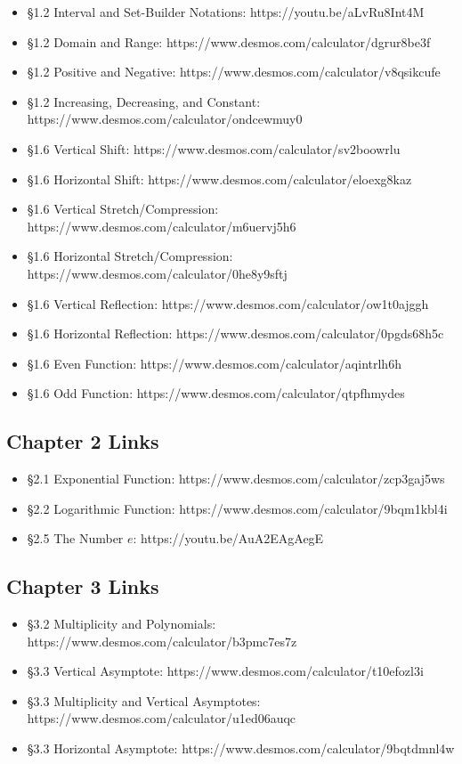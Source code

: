 \begin{itemize}
	\item \S1.2 Interval and Set-Builder Notations: https://youtu.be/aLvRu8Int4M
	\item \S1.2 Domain and Range: https://www.desmos.com/calculator/dgrur8be3f
	\item \S1.2 Positive and Negative: https://www.desmos.com/calculator/v8qsikcufe
	\item \S1.2 Increasing, Decreasing, and Constant: https://www.desmos.com/calculator/ondcewmuy0
	\item \S1.6 Vertical Shift: https://www.desmos.com/calculator/sv2boowrlu
	\item \S1.6 Horizontal Shift: https://www.desmos.com/calculator/eloexg8kaz
	\item \S1.6 Vertical Stretch/Compression: https://www.desmos.com/calculator/m6uervj5h6
	\item \S1.6 Horizontal Stretch/Compression: https://www.desmos.com/calculator/0he8y9sftj
	\item \S1.6 Vertical Reflection: https://www.desmos.com/calculator/ow1t0ajggh
	\item \S1.6 Horizontal Reflection: https://www.desmos.com/calculator/0pgds68h5c
	\item \S1.6 Even Function: https://www.desmos.com/calculator/aqintrlh6h
	\item \S1.6 Odd Function: https://www.desmos.com/calculator/qtpfhmydes
\end{itemize}


\subsection*{Chapter 2 Links} \label{linksfor-chapter2}
\begin{itemize}
	\item \S2.1 Exponential Function: https://www.desmos.com/calculator/zcp3gaj5ws
	\item \S2.2 Logarithmic Function: https://www.desmos.com/calculator/9bqm1kbl4i
	\item \S2.5 The Number $e$: https://youtu.be/AuA2EAgAegE
\end{itemize}

\subsection*{Chapter 3 Links} \label{linksfor-chapter3}
\begin{itemize}
	\item \S3.2 Multiplicity and Polynomials: https://www.desmos.com/calculator/b3pmc7es7z
	\item \S3.3 Vertical Asymptote: https://www.desmos.com/calculator/t10efozl3i
	\item \S3.3 Multiplicity and Vertical Asymptotes:  https://www.desmos.com/calculator/u1ed06auqc
	\item \S3.3 Horizontal Asymptote: https://www.desmos.com/calculator/9bqtdmnl4w
\end{itemize}